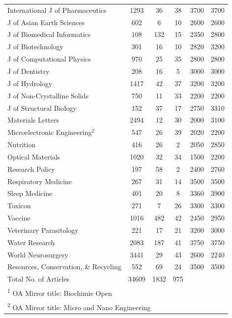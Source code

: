 \documentclass[
  english,
  man]{apa6}
\begin{document}
\begin{table}
{\begin{tabular}[t]{lccccc}
International J of Pharmaceutics & 1293 & 36 & 38 & 3700 & 3700\\
J of Asian Earth Sciences & 602 & 6 & 10 & 2600 & 2600\\
J of Biomedical Informatics & 108 & 132 & 15 & 2350 & 2800\\
J of Biotechnology & 301 & 16 & 10 & 2820 & 3200\\
J of Computational Physics & 970 & 25 & 35 & 2800 & 2800\\
J of Dentistry & 208 & 16 & 5 & 3000 & 3000\\
J of Hydrology & 1417 & 42 & 37 & 3200 & 3200\\
J of Non-Crystalline Solids & 750 & 11 & 33 & 2200 & 2200\\
J of Structural Biology & 152 & 37 & 17 & 2750 & 3310\\
Materials Letters & 2494 & 12 & 30 & 2000 & 3100\\
Microelectronic Engineering$^{2}$ & 547 & 26 & 39 & 2020 & 2200\\
Nutrition & 416 & 26 & 2 & 2050 & 2850\\
Optical Materials & 1020 & 32 & 34 & 1500 & 2200\\
Research Policy & 197 & 58 & 2 & 2400 & 2760\\
Respiratory Medicine & 267 & 31 & 14 & 3500 & 3500\\
Sleep Medicine & 401 & 20 & 8 & 3360 & 3900\\
Toxicon & 271 & 7 & 26 & 3300 & 3300\\
Vaccine & 1016 & 482 & 42 & 2450 & 2950\\
Veterinary Parasitology & 221 & 17 & 21 & 3200 & 3000\\
Water Research & 2083 & 187 & 41 & 3750 & 3750\\
World Neurosurgery & 3441 & 29 & 43 & 2600 & 2240\\
Resources, Conservation, \& Recycling & 552 & 69 & 24 & 3500 & 3500\\
\midrule
Total No. of Articles & 34609 & 1832 & 975 &  & \\
\bottomrule
\multicolumn{6}{l}{\rule{0pt}{1em}\textsuperscript{1} OA Mirror title: Biochimie Open}\\
\multicolumn{6}{l}{\rule{0pt}{1em}\textsuperscript{2} OA Mirror title: Micro and Nano Engineering}\\
\end{tabular}}
\end{table}
\end{document}
